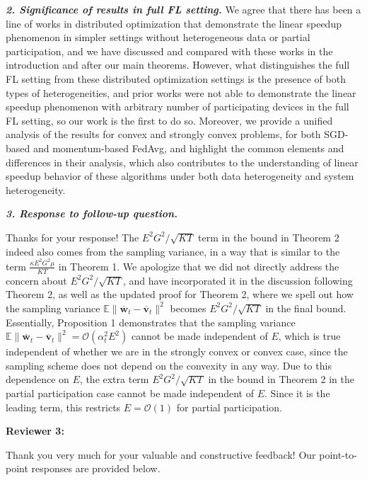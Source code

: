 \documentclass{article}
\newcommand{\ov}[1]{{\overline{\mathbf{#1}}}}
\begin{document}
\textbf{\textit{2. Significance of results in full FL setting.}} 
We agree that there has been a line of works in distributed optimization that demonstrate the linear speedup phenomenon in simpler settings without heterogeneous data or partial participation, and we have discussed and compared with these works in the introduction and after our main theorems. However, what distinguishes the full FL setting from these distributed optimization settings is the presence of both types of heterogeneities, and prior works were not able to demonstrate the linear speedup phenomenon with arbitrary number of participating devices in the full FL setting, so our work is the first to do so. Moreover, we provide a unified analysis of the results for convex and strongly convex problems, for both SGD-based and momentum-based FedAvg, and highlight the common elements and differences in their analysis, which also contributes to the understanding of linear speedup behavior of these algorithms under both data heterogeneity and system heterogeneity.

\textbf{\textit{3. Response to follow-up question.}}

Thanks for your response! The $E^2 G^2/\sqrt{KT}$ term in the bound in Theorem 2 indeed also comes from the sampling variance, in a way that is similar to the term $\frac{\kappa E^2 G^2 \mu}{KT}$ in Theorem 1. We apologize that we did not directly address the concern about $E^2 G^2/\sqrt{KT}$, and have incorporated it in the discussion following Theorem 2, as well as the updated proof for Theorem 2, where we spell out how the sampling variance $\mathbb{E}\|\ov{w}_t-\ov{v}_t\|^2$ becomes $E^2 G^2/\sqrt{KT}$ in the final bound. Essentially, Proposition 1 demonstrates that the sampling variance $\mathbb{E}\|\ov{w}_t-\ov{v}_t\|^2=\mathcal{O}(\alpha_t^2 E^2)$ cannot be made independent of $E$, which is true independent of whether we are in the strongly convex or convex case, since the sampling scheme does not depend on the convexity in any way. Due to this dependence on $E$, the extra term $E^2 G^2/\sqrt{KT}$ in the bound in Theorem 2 in the partial participation case cannot be made independent of $E$. Since it is the leading term, this restricts $E=\mathcal{O}(1)$ for partial participation.

{\color{blue}\textbf{Reviewer 3:}} 

Thank you very much for your valuable and constructive feedback! Our point-to-point responses are provided below.
\end{document}
